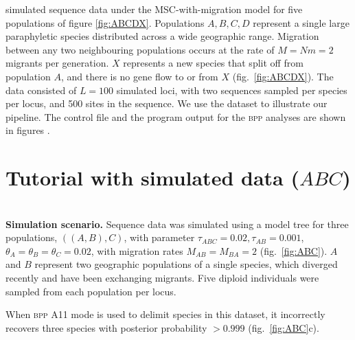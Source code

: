 \documentclass[A4]{article1}
\newcommand{\red}[1]{{\color{red}{#1}}}
\begin{document}
\citet{Leache2019} simulated sequence data under the MSC-with-migration model for five
populations of figure \ref{fig:ABCDX}.  Populations $A, B, C, D$ represent a single
large paraphyletic species distributed across a wide geographic range.  Migration
between any two neighbouring populations occurs at the rate of $M = Nm = 2$ migrants per
generation. $X$ represents a new species that split off from population $A$, and there
is no gene flow to or from $X$ (fig.~\ref{fig:ABCDX}).  The data consisted of $L=100$
simulated loci, with two sequences sampled per species per locus, and 500 sites in the
sequence.  We use the dataset to illustrate our pipeline.  The control file and the
program output for the \textsc{bpp} analyses are shown in figures .


\section{Tutorial with simulated data ($ABC$)}

\red{[delete this ABC simulation example and replace with the ABCDX example]} \\
   \textbf{Simulation scenario.}  Sequence data was simulated using a model tree for three
   populations, $((A,B),C)$, with parameter $\tau_{ABC} = 0.02, \tau_{AB} = 0.001$,
   $\theta_A = \theta_B = \theta_C = 0.02$, with migration rates $M_{AB} = M_{BA} = 2$
   (fig.~\ref{fig:ABC}).  $A$ and $B$ represent two geographic populations of a single
   species, which diverged recently and have been exchanging migrants. Five diploid
   individuals were sampled from each population per locus.

When \textsc{bpp} A11 mode is used to delimit species in this dataset, it incorrectly
recovers three species with posterior probability $>0.999$
(fig.~\ref{fig:ABC}c).
\end{document}
